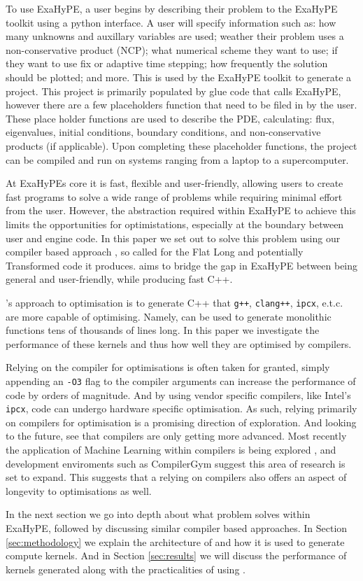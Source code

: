 To use ExaHyPE, a user begins by describing their problem to the ExaHyPE toolkit using a python interface.
A user will specify information such as: how many unknowns and auxillary variables are used; weather their problem uses a non-conservative product (NCP); what numerical scheme they want to use; if they want to use fix or adaptive time stepping; how frequently the solution should be plotted; and more.
This is used by the ExaHyPE toolkit to generate a project.
This project is primarily populated by glue code that calls ExaHyPE, however there are a few placeholders function that need to be filed in by the user.
These place holder functions are used to describe the PDE, calculating: flux, eigenvalues, initial conditions, boundary conditions, and non-conservative products (if applicable).
Upon completing these placeholder functions, the project can be compiled and run on systems ranging from a laptop to a supercomputer.

At ExaHyPEs core it is fast, flexible and user-friendly, allowing users to create fast programs to solve a wide range of problems while requiring minimal effort from the user.
However, the abstraction required within ExaHyPE to achieve this limits the opportunities for optimistations, especially at the boundary between user and engine code.
In this paper we set out to solve this problem using our compiler based approach \phlat, so called for the Flat Long and potentially Transformed code it produces.
\phlat aims to bridge the gap in ExaHyPE between being general and user-friendly, while producing fast C++.  

\phlat{}'s approach to optimisation is to generate C++ that \texttt{g++}, \texttt{clang++}, \texttt{ipcx}, e.t.c. are more capable of optimising.  
Namely, \phlat can be used to generate monolithic functions tens of thousands of lines long.
In this paper we investigate the performance of these kernels and thus how well they are optimised by compilers.

Relying on the compiler for optimisations is often taken for granted, simply appending an \texttt{-O3} flag to the compiler arguments can increase the performance of code by orders of magnitude.
And by using vendor specific compilers, like Intel's \texttt{ipcx}, code can undergo hardware specific optimisation.
As such, relying primarily on compilers for optimisation is a promising direction of exploration.
And looking to the future, see that compilers are only getting more advanced.
Most recently the application of Machine Learning within compilers is being explored \cite{compiler-ml-opt,lots-of-compiler-options}, and development enviroments such as CompilerGym \cite{compiler-gym} suggest this area of research is set to expand.
This suggests that a relying on compilers also offers an aspect of longevity to optimisations as well.

In the next section we go into depth about what problem \phlat solves within ExaHyPE, followed by discussing similar compiler based approaches.
In Section \ref{sec:methodology} we explain the architecture of \phlat and how it is used to generate compute kernels.
And in Section \ref{sec:results} we will discuss the performance of kernels generated along with the practicalities of using \phlat.